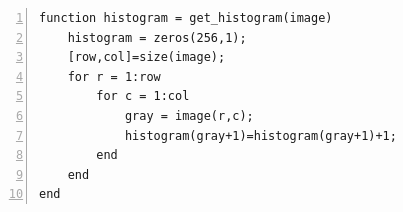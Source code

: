 \documentclass[11pt,oneside]{book}
\begin{document}
\begin{appendices}
\begin{lstlisting}[numbers=left, numberstyle=\tiny,keywordstyle=\color{blue!70},commentstyle=\color{red!50!green!50!blue!50},frame=shadowbox, rulesepcolor=\color{red!20!green!20!blue!20}]
function histogram = get_histogram(image)
    histogram = zeros(256,1);
    [row,col]=size(image);
    for r = 1:row
        for c = 1:col
            gray = image(r,c);
            histogram(gray+1)=histogram(gray+1)+1;
        end
    end
end

\end{lstlisting}

\end{appendices}
\end{document}
